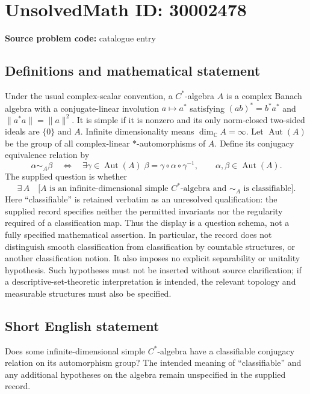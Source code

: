\documentclass[11pt]{article}
\newcommand{\C}{\mathbb{C}}
\begin{document}
\section*{UnsolvedMath ID: 30002478}
\textbf{Source problem code:} catalogue entry
\subsection{Definitions and mathematical statement}
Under the usual complex-scalar convention, a \(C^*\)-algebra \(A\) is a complex Banach algebra with a conjugate-linear involution \(a\mapsto a^*\) satisfying \((ab)^*=b^*a^*\) and \(\|a^*a\|=\|a\|^2\). It is simple if it is nonzero and its only norm-closed two-sided ideals are \(\{0\}\) and \(A\). Infinite dimensionality means \(\dim_{\C}A=\infty\). Let \(\operatorname{Aut}(A)\) be the group of all complex-linear \(*\)-automorphisms of \(A\). Define its conjugacy equivalence relation by
\[
\alpha\sim_A\beta
\quad\Longleftrightarrow\quad
\exists\gamma\in\operatorname{Aut}(A)\;
\beta=\gamma\circ\alpha\circ\gamma^{-1},
\qquad \alpha,\beta\in\operatorname{Aut}(A).
\]
The supplied question is whether
\[
\exists\,A\quad
\bigl[A\text{ is an infinite-dimensional simple }C^*\text{-algebra and }
\sim_A\text{ is classifiable}\bigr].
\]
Here ``classifiable'' is retained verbatim as an unresolved qualification: the supplied record specifies neither the permitted invariants nor the regularity required of a classification map. Thus the display is a question schema, not a fully specified mathematical assertion. In particular, the record does not distinguish smooth classification from classification by countable structures, or another classification notion. It also imposes no explicit separability or unitality hypothesis. Such hypotheses must not be inserted without source clarification; if a descriptive-set-theoretic interpretation is intended, the relevant topology and measurable structures must also be specified.
\subsection{Short English statement}
Does some infinite-dimensional simple \(C^*\)-algebra have a classifiable conjugacy relation on its automorphism group? The intended meaning of ``classifiable'' and any additional hypotheses on the algebra remain unspecified in the supplied record.
\end{document}
